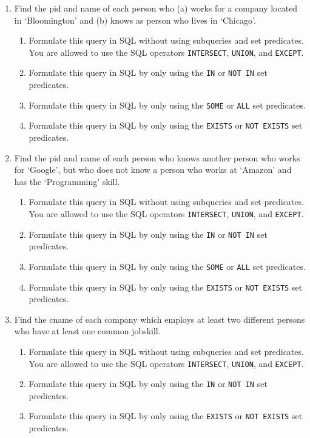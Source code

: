 \begin{enumerate}
\item  Find the pid and name of each person who (a)
works for a company located in `Bloomington'  and (b)
knows as person who lives in `Chicago'.

\begin{enumerate}
\item   Formulate this query in SQL without using subqueries and set predicates.
You are allowed to use the SQL operators {\tt INTERSECT}, {\tt UNION}, and {\tt EXCEPT}.
\item   Formulate this query in SQL by only using the {\tt  IN} or {\tt NOT IN} set predicates.
\item   Formulate this query in SQL by only using the {\tt SOME} or {\tt ALL} set predicates.
\item   Formulate this query in SQL by only using the {\tt EXISTS} or {\tt NOT EXISTS} set predicates.
\end{enumerate}


\item  Find the pid and name of each person who knows another person who works for `Google', but
who does not know a person who works at `Amazon' and has the `Programming' skill.

\begin{enumerate}
\item   Formulate this query in SQL without using subqueries and set predicates.
You are allowed to use the SQL operators {\tt INTERSECT}, {\tt UNION}, and {\tt EXCEPT}.
\item   Formulate this query in SQL by only using the {\tt  IN} or {\tt NOT IN} set predicates.
\item   Formulate this query in SQL by only using the {\tt SOME} or {\tt ALL} set predicates.
\item   Formulate this query in SQL by only using the {\tt EXISTS} or {\tt NOT EXISTS} set predicates.
\end{enumerate}

\item  Find the cname of each company which employs at least two different persons who have
at least one common jobskill.

\begin{enumerate}
\item   Formulate this query in SQL without using subqueries and set predicates.
You are allowed to use the SQL operators {\tt INTERSECT}, {\tt UNION}, and {\tt EXCEPT}.
\item   Formulate this query in SQL by only using the {\tt  IN} or {\tt NOT IN} set predicates.
\item   Formulate this query in SQL by only using the {\tt EXISTS} or {\tt NOT EXISTS} set predicates.
\end{enumerate}


\end{enumerate}
